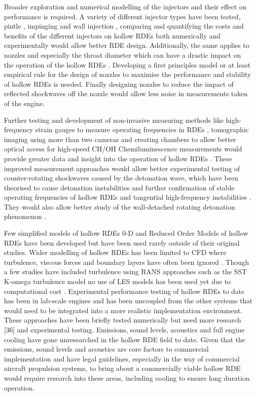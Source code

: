 \documentclass{article}
\begin{document}
Broader exploration and numerical modelling of the injectors and their effect on performance is required. A variety of different injector types have been tested, pintle \cite{Huang2019,1Huang2019}, impinging \cite{Ishihara2023} and wall injection \cite{Sada2022}, comparing and quantifying the costs and benefits of the different injectors on hollow RDEs both numerically and experimentally would allow better RDE design. Additionally, the same applies to nozzles and especially the throat diameter which can have a drastic impact on the operation of the hollow RDEs \cite{Wang2022}. Developing a first principles model or at least empirical rule for the design of nozzles to maximise the performance and stability of hollow RDEs is needed. Finally designing nozzles to reduce the impact of reflected shockwaves off the nozzle would allow less noise in measurements taken of the engine.
\par

Further testing and development of non-invasive measuring methods like high-frequency strain gauges to measure operating frequencies in RDEs \cite{Pritschau2022}, tomographic imaging using more than two cameras and creating chambers to allow better optical access for high-speed CH/OH Chemiluminescence measurements would provide greater data and insight into the operation of hollow RDEs \cite{Betancourt2021,Gaetano2021,1ISHIHARA2023}. These improved measurement approaches would allow better experimental testing of counter-rotating shockwaves caused by the detonation wave, which have been theorised to cause detonation instabilities \cite{2Rong2022} and further confirmation of stable operating frequencies of hollow RDEs and tangential high-frequency instabilities \cite{Fan2022}. They would also allow better study of the wall-detached rotating detonation phenomenon \cite{1Huang2023}.
\par

Few simplified models of hollow RDEs 0-D and Reduced Order Models of hollow RDEs have been developed \cite{Nakata2022,Yokoo2020} but have been used rarely outside of their original studies. Wider modelling of hollow RDEs has been limited to CFD where turbulence, viscous forces and boundary layers have often been ignored \cite{Fan2022}. Though a few studies have included turbulence using RANS approaches such as the SST K-omega turbulence model no use of LES models has been used yet due to computational cost \cite{Sun2019}. Experimental performance testing of hollow RDEs to date has been in lab-scale engines and has been uncoupled from the other systems that would need to be integrated into a more realistic implementation environment. These approaches have been briefly tested numerically but need more research [36] and experimental testing. Emissions, sound levels, acoustics and full engine cooling have gone unresearched in the hollow RDE field to date. Given that the emissions, sound levels and acoustics are core factors to commercial implementation and have legal guidelines, especially in the way of commercial aircraft propulsion systems, to bring about a commercially viable hollow RDE would require research into these areas, including cooling to ensure long duration operation.
\par
\end{document}
